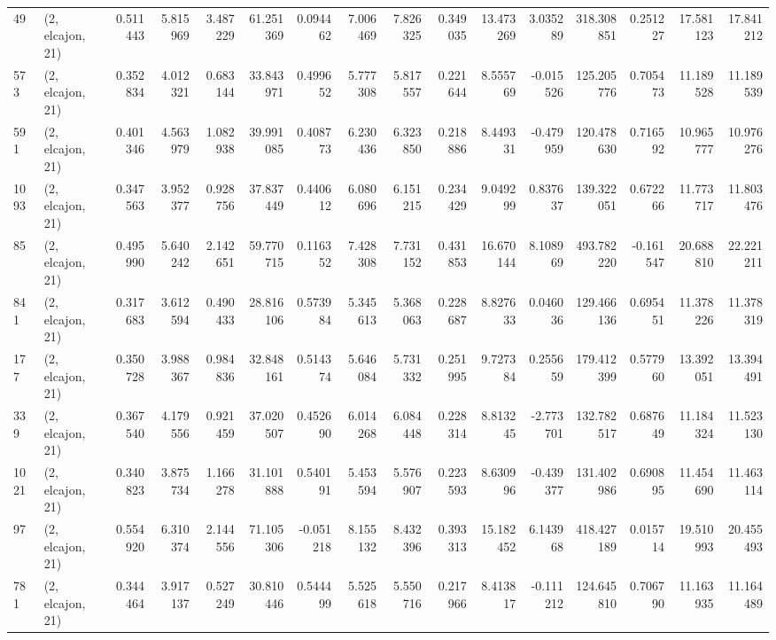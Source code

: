 \begin{tabular}{llrrrrrrrrrrrrrr}
49   &  (2, elcajon, 21) &   0.511443 &   5.815969 &   3.487229 &     61.251369 &    0.094462 &    7.006469 &    7.826325 &  0.349035 &  13.473269 &   3.035289 &   318.308851 &   0.251227 &  17.581123 &  17.841212 \\
573  &  (2, elcajon, 21) &   0.352834 &   4.012321 &   0.683144 &     33.843971 &    0.499652 &    5.777308 &    5.817557 &  0.221644 &   8.555769 &  -0.015526 &   125.205776 &   0.705473 &  11.189528 &  11.189539 \\
591  &  (2, elcajon, 21) &   0.401346 &   4.563979 &   1.082938 &     39.991085 &    0.408773 &    6.230436 &    6.323850 &  0.218886 &   8.449331 &  -0.479959 &   120.478630 &   0.716592 &  10.965777 &  10.976276 \\
1093 &  (2, elcajon, 21) &   0.347563 &   3.952377 &   0.928756 &     37.837449 &    0.440612 &    6.080696 &    6.151215 &  0.234429 &   9.049299 &   0.837637 &   139.322051 &   0.672266 &  11.773717 &  11.803476 \\
85   &  (2, elcajon, 21) &   0.495990 &   5.640242 &   2.142651 &     59.770715 &    0.116352 &    7.428308 &    7.731152 &  0.431853 &  16.670144 &   8.108969 &   493.782220 &  -0.161547 &  20.688810 &  22.221211 \\
841  &  (2, elcajon, 21) &   0.317683 &   3.612594 &   0.490433 &     28.816106 &    0.573984 &    5.345613 &    5.368063 &  0.228687 &   8.827633 &   0.046036 &   129.466136 &   0.695451 &  11.378226 &  11.378319 \\
177  &  (2, elcajon, 21) &   0.350728 &   3.988367 &   0.984836 &     32.848161 &    0.514374 &    5.646084 &    5.731332 &  0.251995 &   9.727384 &   0.255659 &   179.412399 &   0.577960 &  13.392051 &  13.394491 \\
339  &  (2, elcajon, 21) &   0.367540 &   4.179556 &   0.921459 &     37.020507 &    0.452690 &    6.014268 &    6.084448 &  0.228314 &   8.813245 &  -2.773701 &   132.782517 &   0.687649 &  11.184324 &  11.523130 \\
1021 &  (2, elcajon, 21) &   0.340823 &   3.875734 &   1.166278 &     31.101888 &    0.540191 &    5.453594 &    5.576907 &  0.223593 &   8.630996 &  -0.439377 &   131.402986 &   0.690895 &  11.454690 &  11.463114 \\
97   &  (2, elcajon, 21) &   0.554920 &   6.310374 &   2.144556 &     71.105306 &   -0.051218 &    8.155132 &    8.432396 &  0.393313 &  15.182452 &   6.143968 &   418.427189 &   0.015714 &  19.510993 &  20.455493 \\
781  &  (2, elcajon, 21) &   0.344464 &   3.917137 &   0.527249 &     30.810446 &    0.544499 &    5.525618 &    5.550716 &  0.217966 &   8.413817 &  -0.111212 &   124.645810 &   0.706790 &  11.163935 &  11.164489 \\

\end{tabular}
